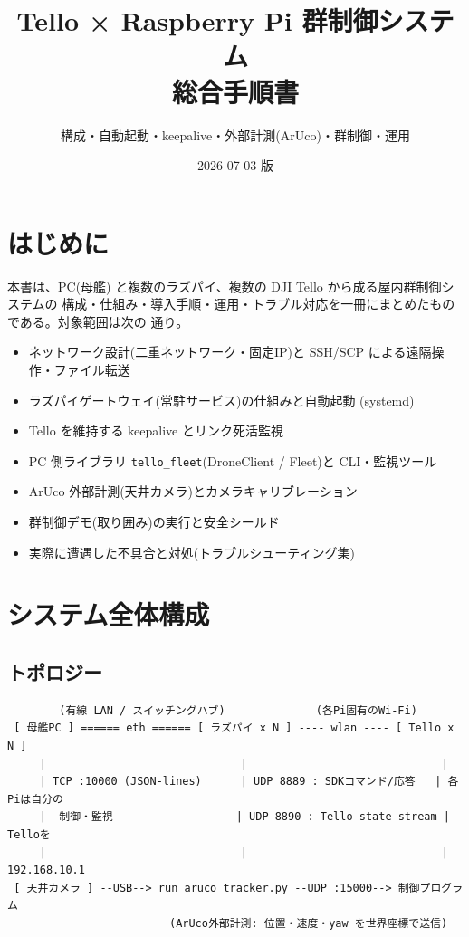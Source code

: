 \documentclass[11pt,a4paper]{ltjsarticle}
\title{\textbf{Tello × Raspberry Pi 群制御システム\\ 総合手順書}}
\author{構成・自動起動・keepalive・外部計測(ArUco)・群制御・運用}
\date{2026-07-03 版}
\newcommand{\code}[1]{\texttt{\small #1}}
\begin{document}
\maketitle
\tableofcontents
\newpage

\section{はじめに}
本書は、PC(母艦) と複数のラズパイ、複数の DJI Tello から成る屋内群制御システムの
構成・仕組み・導入手順・運用・トラブル対応を一冊にまとめたものである。対象範囲は次の
通り。

\begin{itemize}[leftmargin=1.4em]
  \item ネットワーク設計(二重ネットワーク・固定IP)と SSH/SCP による遠隔操作・ファイル転送
  \item ラズパイゲートウェイ(常駐サービス)の仕組みと自動起動 (systemd)
  \item Tello を維持する keepalive とリンク死活監視
  \item PC 側ライブラリ \code{tello\_fleet}(DroneClient / Fleet)と CLI・監視ツール
  \item ArUco 外部計測(天井カメラ)とカメラキャリブレーション
  \item 群制御デモ(取り囲み)の実行と安全シールド
  \item 実際に遭遇した不具合と対処(トラブルシューティング集)
\end{itemize}

\section{システム全体構成}

\subsection{トポロジー}
\begin{lstlisting}
        (有線 LAN / スイッチングハブ)              (各Pi固有のWi-Fi)
 [ 母艦PC ] ====== eth ====== [ ラズパイ x N ] ---- wlan ---- [ Tello x N ]
     |                              |                              |
     | TCP :10000 (JSON-lines)      | UDP 8889 : SDKコマンド/応答   | 各Piは自分の
     |  制御・監視                   | UDP 8890 : Tello state stream |  Telloを
     |                              |                              | 192.168.10.1
 [ 天井カメラ ] --USB--> run_aruco_tracker.py --UDP :15000--> 制御プログラム
                         (ArUco外部計測: 位置・速度・yaw を世界座標で送信)
\end{lstlisting}
\end{document}
